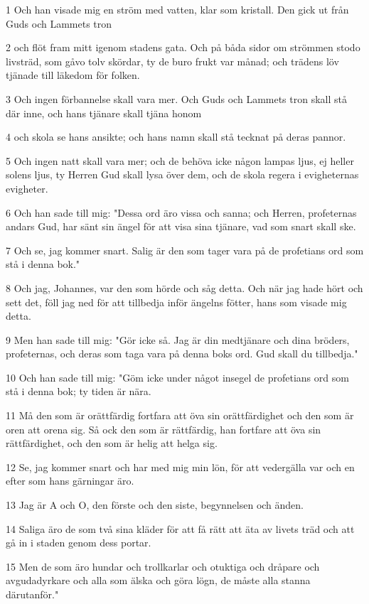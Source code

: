 \par 1 Och han visade mig en ström med vatten, klar som kristall. Den gick ut från Guds och Lammets tron
\par 2 och flöt fram mitt igenom stadens gata. Och på båda sidor om strömmen stodo livsträd, som gåvo tolv skördar, ty de buro frukt var månad; och trädens löv tjänade till läkedom för folken.
\par 3 Och ingen förbannelse skall vara mer. Och Guds och Lammets tron skall stå där inne, och hans tjänare skall tjäna honom
\par 4 och skola se hans ansikte; och hans namn skall stå tecknat på deras pannor.
\par 5 Och ingen natt skall vara mer; och de behöva icke någon lampas ljus, ej heller solens ljus, ty Herren Gud skall lysa över dem, och de skola regera i evigheternas evigheter.
\par 6 Och han sade till mig: "Dessa ord äro vissa och sanna; och Herren, profeternas andars Gud, har sänt sin ängel för att visa sina tjänare, vad som snart skall ske.
\par 7 Och se, jag kommer snart. Salig är den som tager vara på de profetians ord som stå i denna bok."
\par 8 Och jag, Johannes, var den som hörde och såg detta. Och när jag hade hört och sett det, föll jag ned för att tillbedja inför ängelns fötter, hans som visade mig detta.
\par 9 Men han sade till mig: "Gör icke så. Jag är din medtjänare och dina bröders, profeternas, och deras som taga vara på denna boks ord. Gud skall du tillbedja."
\par 10 Och han sade till mig: "Göm icke under något insegel de profetians ord som stå i denna bok; ty tiden är nära.
\par 11 Må den som är orättfärdig fortfara att öva sin orättfärdighet och den som är oren att orena sig. Så ock den som är rättfärdig, han fortfare att öva sin rättfärdighet, och den som är helig att helga sig.
\par 12 Se, jag kommer snart och har med mig min lön, för att vedergälla var och en efter som hans gärningar äro.
\par 13 Jag är A och O, den förste och den siste, begynnelsen och änden.
\par 14 Saliga äro de som två sina kläder för att få rätt att äta av livets träd och att gå in i staden genom dess portar.
\par 15 Men de som äro hundar och trollkarlar och otuktiga och dråpare och avgudadyrkare och alla som älska och göra lögn, de måste alla stanna därutanför."
